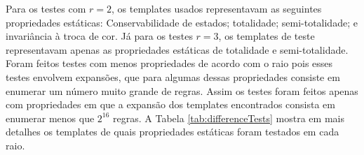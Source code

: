 Para os testes com $r = 2$, os templates usados representavam as seguintes propriedades estáticas: Conservabilidade de estados; totalidade; semi-totalidade; e invariância à troca de cor. Já para os testes $r = 3$, os templates de teste representavam apenas as propriedades estáticas de totalidade e semi-totalidade. Foram feitos testes com menos propriedades de acordo com o raio pois esses testes envolvem expansões, que para algumas dessas propriedades consiste em enumerar um número muito grande de regras. Assim os testes foram feitos apenas com propriedades em que a expansão dos templates encontrados consista em enumerar menos que $2^{16}$ regras. A Tabela \ref{tab:differenceTests} mostra em mais detalhes os templates de quais propriedades estáticas foram testados em cada raio.

\begin{table}[h!]
\centering
\caption{Teste de diferença entre templates feito em cada raio}
\label{tab:differenceTests}
\end{table}

